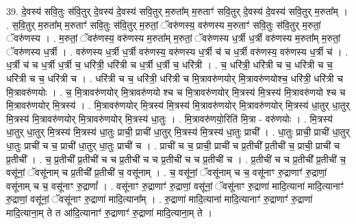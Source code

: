 \documentclass[17pt]{extarticle}
\begin{document}
39. दे॒वस्य॑ सवि॒तुः स॑वि॒तुर् दे॒वस्य॑ दे॒वस्य॑ सवि॒तुर् म॒रुता᳚म् म॒रुताꣳ॑ सवि॒तुर् दे॒वस्य॑ दे॒वस्य॑ सवि॒तुर् म॒रुता᳚म् । . स॒वि॒तुर् म॒रुता᳚म् म॒रुताꣳ॑ सवि॒तुः स॑वि॒तुर् म॒रुतां॒ ॅवरु॑णस्य॒ वरु॑णस्य म॒रुताꣳ॑ सवि॒तुः 
स॑वि॒तुर् म॒रुतां॒ ॅवरु॑णस्य । . म॒रुतां॒ ॅवरु॑णस्य॒ वरु॑णस्य म॒रुता᳚म् म॒रुतां॒ ॅवरु॑णस्य ध॒र्त्री ध॒र्त्री वरु॑णस्य म॒रुता᳚म् म॒रुतां॒ ॅवरु॑णस्य ध॒र्त्री । . वरु॑णस्य ध॒र्त्री ध॒र्त्री वरु॑णस्य॒ वरु॑णस्य ध॒र्त्री च॑ च ध॒र्त्री वरु॑णस्य॒ वरु॑णस्य ध॒र्त्री च॑ । . ध॒र्त्री च॑ च ध॒र्त्री ध॒र्त्री च॒ धरि॑त्री॒ धरि॑त्री च ध॒र्त्री ध॒र्त्री च॒ धरि॑त्री । . च॒ धरि॑त्री॒ धरि॑त्री च च॒ धरि॑त्री च च॒ धरि॑त्री च च॒ धरि॑त्री च । . धरि॑त्री च च॒ धरि॑त्री॒ धरि॑त्री च मि॒त्रावरु॑णयोर् मि॒त्रावरु॑णयोश्च॒ धरि॑त्री॒ धरि॑त्री च मि॒त्रावरु॑णयोः । . च॒ मि॒त्रावरु॑णयोर् मि॒त्रावरु॑णयो श्च च मि॒त्रावरु॑णयोर् मि॒त्रस्य॑ मि॒त्रस्य॑ मि॒त्रावरु॑णयो श्च च मि॒त्रावरु॑णयोर् मि॒त्रस्य॑ । . मि॒त्रावरु॑णयोर् मि॒त्रस्य॑ मि॒त्रस्य॑ मि॒त्रावरु॑णयोर् मि॒त्रावरु॑णयोर् मि॒त्रस्य॑ धा॒तुर् धा॒तुर् मि॒त्रस्य॑ मि॒त्रावरु॑णयोर् मि॒त्रावरु॑णयोर् मि॒त्रस्य॑ धा॒तुः । . मि॒त्रावरु॑णयो॒रिति॑ मि॒त्रा - वरु॑णयोः । . मि॒त्रस्य॑ धा॒तुर् धा॒तुर् मि॒त्रस्य॑ मि॒त्रस्य॑ धा॒तुः प्राची॒ प्राची॑ धा॒तुर् मि॒त्रस्य॑ मि॒त्रस्य॑ धा॒तुः प्राची᳚ । . धा॒तुः प्राची॒ प्राची॑ धा॒तुर् धा॒तुः प्राची॑ च च॒ प्राची॑ धा॒तुर् धा॒तुः प्राची॑ च । . प्राची॑ च च॒ प्राची॒ प्राची॑ च प्र॒तीची᳚ प्र॒तीची॑ च॒ प्राची॒ प्राची॑ च प्र॒तीची᳚ । . च॒ प्र॒तीची᳚ प्र॒तीची॑ च च प्र॒तीची॑ च च प्र॒तीची॑ च च प्र॒तीची॑ च । . प्र॒तीची॑ च च प्र॒तीची᳚ प्र॒तीची॑ च॒ वसू॑नां॒ ॅवसू॑नाम् च प्र॒तीची᳚ प्र॒तीची॑ च॒ वसू॑नाम् । . च॒ वसू॑नां॒ ॅवसू॑नाम् च च॒ वसू॑नाꣳ रु॒द्राणाꣳ॑ रु॒द्राणां॒ वसू॑नाम् च च॒ वसू॑नाꣳ रु॒द्राणां᳚ । . वसू॑नाꣳ रु॒द्राणाꣳ॑ रु॒द्राणां॒ वसू॑नां॒ ॅवसू॑नाꣳ रु॒द्राणा॑ मादि॒त्याना॑ मादि॒त्यानाꣳ॑ रु॒द्राणां॒ वसू॑नां॒ ॅवसू॑नाꣳ रु॒द्राणा॑ मादि॒त्याना᳚म् । . रु॒द्राणा॑ मादि॒त्याना॑ मादि॒त्यानाꣳ॑ रु॒द्राणाꣳ॑ रु॒द्राणा॑ मादि॒त्याना॒म् ते त आ॑दि॒त्यानाꣳ॑ 
रु॒द्राणाꣳ॑ रु॒द्राणा॑ मादि॒त्याना॒म् ते । \newline
\pagebreak
{}
\end{document}
